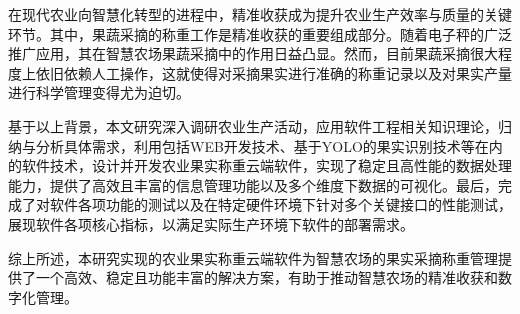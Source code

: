在现代农业向智慧化转型的进程中，精准收获成为提升农业生产效率与质量的关键环节。其中，果蔬采摘的称重工作是精准收获的重要组成部分。随着电子秤的广泛推广应用，其在智慧农场果蔬采摘中的作用日益凸显。然而，目前果蔬采摘很大程度上依旧依赖人工操作，这就使得对采摘果实进行准确的称重记录以及对果实产量进行科学管理变得尤为迫切。

基于以上背景，本文研究深入调研农业生产活动，应用软件工程相关知识理论，归纳与分析具体需求，利用包括WEB开发技术、基于YOLO的果实识别技术等在内的软件技术，设计并开发农业果实称重云端软件，实现了稳定且高性能的数据处理能力，提供了高效且丰富的信息管理功能以及多个维度下数据的可视化。最后，完成了对软件各项功能的测试以及在特定硬件环境下针对多个关键接口的性能测试，展现软件各项核心指标，以满足实际生产环境下软件的部署需求。

综上所述，本研究实现的农业果实称重云端软件为智慧农场的果实采摘称重管理提供了一个高效、稳定且功能丰富的解决方案，有助于推动智慧农场的精准收获和数字化管理。 